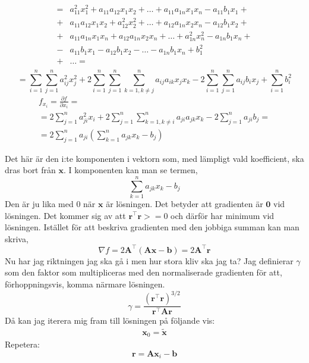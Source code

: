\documentclass{article}
\begin{document}
\begin{align*}
    = & a_{11}^2 x_1^2 + a_{11}a_{12} x_{1}x_2 + \ldots + a_{11}a_{1n} x_1x_n - 
    a_{11}b_1x_1 +  \\
    + & a_{11}a_{12} x_1x_2 + a_{12}^2 x_2^2 + \ldots + a_{12}a_{1n} x_2x_n - 
    a_{12}b_1x_2 + \\
    + & a_{11}a_{1n} x_1x_n + a_{12}a_{1n} x_2x_n + \ldots + a_{1n}^2 x_n^2 - 
    a_{1n}b_1x_n + \\
    - & a_{11}b_1 x_1 - a_{12}b_1 x_2 - \ldots - a_{1n} b_1 x_n + 
    b_1^2  \\    
     + & \ldots = \\
\end{align*}
\[
    = \sum_{i = 1}^{n} \sum_{j=1}^{n}a_{ij}^2 x_j^2 + 2\sum_{i = 1}^{n} \sum_{j = 1}^{n} 
    \sum_{k=1, k \ne j}^{n} a_{ij}a_{ik} x_j x_k - 2 \sum_{i = 1}^{n} 
    \sum_{j = 1}^{n} a_{ij}b_i x_j + \sum_{i = 1}^{n} b_i^2
\]
\begin{gather*}
    f_{x_i} = \frac{\partial f}{\partial  x_i} = \\
    =2 \sum_{j=1}^{n} a_{ji}^2 x_i + 2 \sum_{j=1}^{n} 
    \sum_{k = 1, k \ne i}^{n}a_{ji}a_{jk} x_k
    - 2 \sum_{j=1}^{n} a_{ji} b_j =\\
    = 2 \sum_{j=1}^{n} a_{ji} \left( \sum_{k = 1}^{n} a_{jk} x_k - b_j \right)    
\end{gather*}

Det här är den i:te komponenten i vektorn som, med lämpligt vald koefficient, 
ska dras bort från $\mathbf{x}$. I komponenten kan man se termen,
\[
    \sum_{k = 1}^{n} a_{jk} x_k - b_j
\]
Den är ju lika med $0$ när $\mathbf{x}$ är lösningen. Det betyder att gradienten 
är $\mathbf{0}$ vid lösningen. Det kommer sig av att 
$\mathbf{r}^\intercal\mathbf{r}>=0$ och därför har minimum 
vid lösningen.
Istället för att beskriva gradienten med den jobbiga summan kan man skriva,
\begin{equation}
    \nabla f = 2 \mathbf{A}^\intercal (\mathbf{A} \mathbf{x} - \mathbf{b}) =  2 \mathbf{A}^\intercal \mathbf{r}  
\end{equation}
Nu har jag riktningen jag ska gå i men hur stora kliv ska jag ta?
Jag definierar $\gamma$ som den faktor som multipliceras med den normaliserade
 gradienten för att, förhoppningsvis, komma närmare lösningen.
\begin{equation}
    \gamma = \frac{(\mathbf{r}^\intercal\mathbf{r})^{3/2}}{\mathbf{r}^\intercal\mathbf{A}\mathbf{r}}
\end{equation}
Då kan jag iterera mig fram till lösningen på följande vis:
\begin{gather*}
    \mathbf{x}_0 = \mathbf{\tilde{x} }
\end{gather*}
Repetera:
\begin{equation*}
    \mathbf{r} = \mathbf{A}\mathbf{x}_i - \mathbf{b}
\end{equation*}
\end{document}
